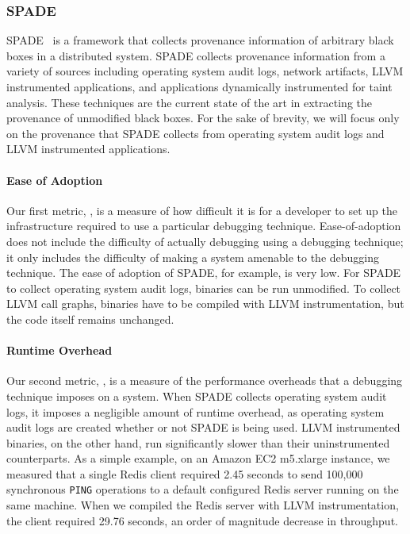 \subsubsection{SPADE}
SPADE~\cite{gehani2012spade} is a framework that collects provenance
information of arbitrary black boxes in a distributed system. SPADE collects
provenance information from a variety of sources including operating system
audit logs, network artifacts, LLVM instrumented applications, and applications
dynamically instrumented for taint analysis. These techniques are the current
state of the art in extracting the provenance of unmodified black boxes. For the
sake of brevity, we will focus only on the provenance that SPADE collects from
operating system audit logs and LLVM instrumented applications.

\paragraph{Ease of Adoption}
Our first metric, , is a measure of how difficult it
is for a developer to set up the infrastructure required to use a particular
debugging technique. Ease-of-adoption does not include the difficulty of
actually debugging using a debugging technique; it only includes the difficulty
of making a system amenable to the debugging technique.
%
The ease of adoption of SPADE, for example, is very low. For SPADE to collect
operating system audit logs, binaries can be run unmodified. To collect LLVM
call graphs, binaries have to be compiled with LLVM instrumentation, but the
code itself remains unchanged.

\paragraph{Runtime Overhead}
Our second metric, , is a measure of the performance
overheads that a debugging technique imposes on a system.
%
When SPADE collects operating system audit logs, it imposes a negligible amount
of runtime overhead, as operating system audit logs are created whether or not
SPADE is being used. LLVM instrumented binaries, on the other hand, run
significantly slower than their uninstrumented counterparts. As a simple
example, on an Amazon EC2 m5.xlarge instance, we measured that a single Redis
client required 2.45 seconds to send 100,000 synchronous \texttt{PING}
operations to a default configured Redis server running on the same machine.
When we compiled the Redis server with LLVM instrumentation, the client
required 29.76 seconds, an order of magnitude decrease in throughput.

